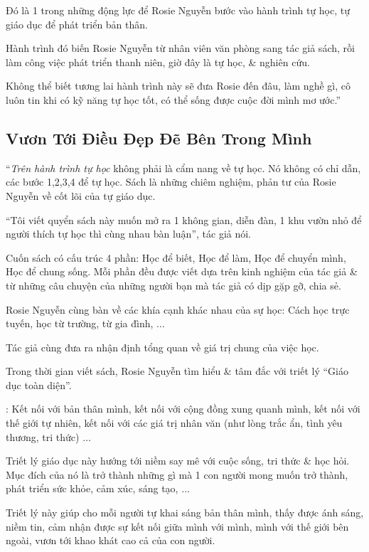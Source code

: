 \documentclass[oneside]{book}
\numberwithin{equation}{section}
\begin{document}
Đó là 1 trong những động lực để Rosie Nguyễn bước vào hành trình tự học, tự giáo dục để phát triển bản thân.

Hành trình đó biến Rosie Nguyễn từ nhân viên văn phòng sang tác giả sách, rồi làm công việc phát triển thanh niên, giờ đây là tự học, \& nghiên cứu.

Không thể biết tương lai hành trình này sẽ đưa Rosie đến đâu, làm nghề gì, cô luôn tin khi có kỹ năng tự học tốt, có thể sống được cuộc đời mình mơ ước.''

\subsection{Vươn Tới Điều Đẹp Đẽ Bên Trong Mình}
``\textit{Trên hành trình tự học} không phải là cẩm nang về tự học. Nó không có chỉ dẫn, các bước 1,2,3,4 để tự học. Sách là những chiêm nghiệm, phản tư của Rosie Nguyễn về cốt lõi của tự giáo dục.

``Tôi viết quyển sách này muốn mở ra 1 không gian, diễn đàn, 1 khu vườn nhỏ để người thích tự học thì cùng nhau bàn luận'', tác giả nói.

Cuốn sách có cấu trúc 4 phần: Học để biết, Học để làm, Học để chuyển mình, Học để chung sống. Mỗi phần đều được viết dựa trên kinh nghiệm của tác giả \& từ những câu chuyện của những người bạn mà tác giả có dịp gặp gỡ, chia sẻ.

Rosie Nguyễn cùng bàn về các khía cạnh khác nhau của sự học: Cách học trực tuyến, học từ trường, từ gia đình, $\ldots$

Tác giả cùng đưa ra nhận định tổng quan về giá trị chung của việc học.

Trong thời gian viết sách, Rosie Nguyễn tìm hiểu \& tâm đắc với triết lý ``Giáo dục toàn diện''.

: Kết nối với bản thân mình, kết nối với cộng đồng xung quanh mình, kết nối với thế giới tự nhiên, kết nối với các giá trị nhân văn (như lòng trắc ẩn, tình yêu thương, tri thức) $\ldots$

Triết lý giáo dục này hướng tới niềm say mê với cuộc sống, tri thức \& học hỏi. Mục đích của nó là trở thành những gì mà 1 con người mong muốn trở thành, phát triển sức khỏe, cảm xúc, sáng tạo, $\ldots$

Triết lý này giúp cho mỗi người tự khai sáng bản thân mình, thấy được ánh sáng, niềm tin, cảm nhận được sự kết nối giữa mình với mình, mình với thế giới bên ngoài, vươn tới khao khát cao cả của con người.
\end{document}
